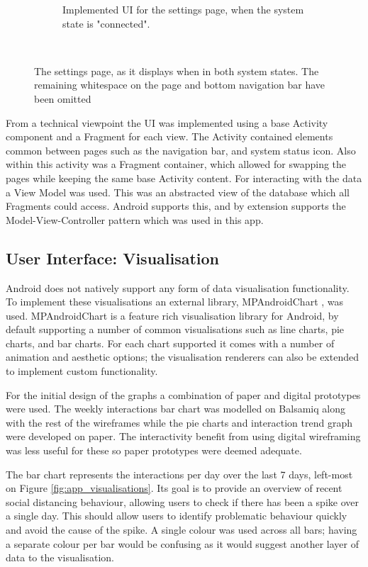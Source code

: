 \documentclass{l4proj}
\begin{document}
\begin{figure}[!htb]
\begin{subfigure}[b]{0.47\textwidth}
        \caption{ Implemented UI for the settings page, when the system state is "connected". }
        \label{fig:settings_connected}
    \end{subfigure}
    ~
    \caption{ The settings page, as it displays when in both system states. The remaining whitespace on the page and bottom navigation bar have been omitted }
    \label{fig:settings_page}
\end{figure}

From a technical viewpoint the UI was implemented using a base Activity component and a Fragment for each view. The Activity contained elements common between pages such as the navigation bar, and system status icon. Also within this activity was a Fragment container, which allowed for swapping the pages while keeping the same base Activity content. For interacting with the data a View Model was used. This was an abstracted view of the database which all Fragments could access. Android supports this, and by extension supports the Model-View-Controller pattern which was used in this app.

\subsection{User Interface: Visualisation}

Android does not natively support any form of data visualisation functionality. To implement these visualisations an external library, MPAndroidChart \citep{jahoda_mpandroidchart_2020}, was used. MPAndroidChart is a feature rich visualisation library for Android, by default supporting a number of common visualisations such as line charts, pie charts, and bar charts. For each chart supported it comes with a number of animation and aesthetic options; the visualisation renderers can also be extended to implement custom functionality.

For the initial design of the graphs a combination of paper and digital prototypes were used. The weekly interactions bar chart was modelled on Balsamiq along with the rest of the wireframes while the pie charts and interaction trend graph were developed on paper. The interactivity benefit from using digital wireframing was less useful for these so paper prototypes were deemed adequate.

The bar chart represents the interactions per day over the last 7 days, left-most on Figure \ref{fig:app_visualisations}. Its goal is to provide an overview of recent social distancing behaviour, allowing users to check if there has been a spike over a single day. This should allow users to identify problematic behaviour quickly and avoid the cause of the spike. A single colour was used across all bars; having a separate colour per bar would be confusing as it would suggest another layer of data to the visualisation.
\end{document}

